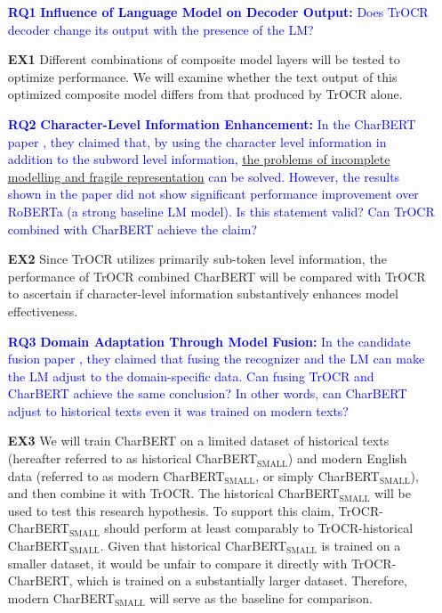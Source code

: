 \begin{itemize}
    \item[\textcolor{Blue}{\textbf{RQ1}}] \textcolor{Blue}{\textbf{Influence of Language Model on Decoder Output: }Does TrOCR decoder change its output with the presence of the LM?}
    \item[\textbf{EX1}] Different combinations of composite model layers will be tested to optimize performance. We will examine whether the text output of this optimized composite model differs from that produced by TrOCR alone.

    \vspace{7mm}
    \item[\textcolor{Blue}{\textbf{RQ2}}] \textcolor{Blue}{\textbf{Character-Level Information Enhancement:} In the CharBERT paper \citep{ma-etal-2020-charbert}, they claimed that, by using the character level information in addition to the subword level information, \hyperref[sec:2_charbert]{the problems of incomplete modelling and fragile 
    representation} can be solved. However, the results shown in the paper did not show significant performance improvement over RoBERTa (a strong baseline LM model). Is this statement valid? Can TrOCR combined with CharBERT achieve the claim?}
    \item[\textbf{EX2}] Since TrOCR utilizes primarily sub-token level information,  the performance of TrOCR combined CharBERT will be compared with TrOCR to ascertain if character-level information substantively enhances model effectiveness.

    \vspace{7mm}
    \item[\textcolor{Blue}{\textbf{RQ3}}] \textcolor{Blue}{\textbf{Domain Adaptation Through Model Fusion:} In the candidate fusion paper , they claimed that fusing the recognizer and the LM can make the LM adjust to the domain-specific data. Can fusing TrOCR and CharBERT achieve the same conclusion? In other words, can CharBERT adjust to historical texts even it was trained on modern texts?}
    \item[\textbf{EX3}] We will train CharBERT on a limited dataset of historical texts (hereafter referred to as historical CharBERT$_{\text{SMALL}}$) and modern English data (referred to as modern CharBERT$_{\text{SMALL}}$, or simply CharBERT$_{\text{SMALL}}$), and then combine it with TrOCR. The historical CharBERT$_{\text{SMALL}}$ will be used to test this research hypothesis. To support this claim, TrOCR-CharBERT$_{\text{SMALL}}$ should perform at least comparably to TrOCR-historical CharBERT$_{\text{SMALL}}$. Given that historical CharBERT$_{\text{SMALL}}$ is trained on a smaller dataset, it would be unfair to compare it directly with TrOCR-CharBERT, which is trained on a substantially larger dataset. Therefore, modern CharBERT$_{\text{SMALL}}$ will serve as the baseline for comparison.


\end{itemize}
